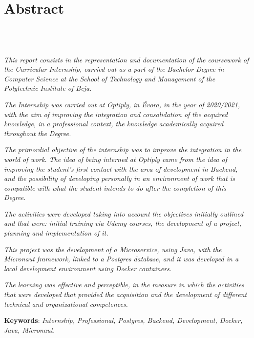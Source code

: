 \chapter{Abstract}
\section*{\textit{\TITLE}\\  {\small{\textit{\SUBTITLE}}}}

\textit{This report consists in the representation and documentation of the coursework of the Curricular Internship, carried out as a part of the Bachelor Degree in Computer Science at the School of Technology and Management of the Polytechnic Institute of Beja.}

\textit{The Internship was carried out at Optiply, in Évora, in the year of 2020/2021, with the aim of improving the integration and consolidation of the acquired knowledge, in a professional context, the knowledge academically acquired throughout the Degree.}

\textit{The primordial objective of the internship was to improve the integration in the world of work. The idea of being interned at Optiply came from the idea of improving the student's first contact with the area of development in Backend, and the possibility of developing personally in an environment of work that is compatible with what the student intends to do after the completion of this Degree.}

\textit{The activities were developed taking into account the objectives initially outlined and that were: initial training via Udemy courses, the development of a project, planning and implementation of it.}

\textit{This project was the development of a Microservice, using Java, with the Micronaut framework, linked to a Postgres database, and it was developed in a local development environment using Docker containers.}

\textit{The learning was effective and perceptible, in the measure in which the activities that were developed that provided the acquisition and the development of different technical and organizational competences.}

\textbf{Keywords}: \textit{Internship, Professional, Postgres, Backend, Development, Docker, Java, Micronaut}.
